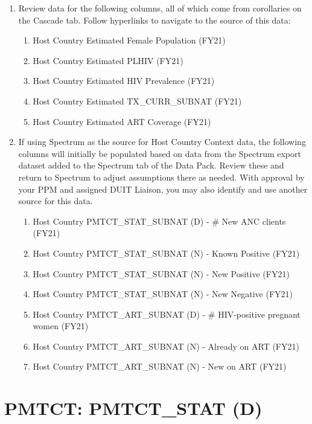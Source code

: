 \documentclass[
  openany]{book}
\begin{document}
\begin{enumerate}
\def\labelenumi{\arabic{enumi}.}
\item
  Review data for the following columns, all of which come from
  corollaries on the Cascade tab. Follow hyperlinks to navigate to the
  source of this data:

  \begin{enumerate}
  \def\labelenumii{\alph{enumii}.}
  \item
    Host Country Estimated Female Population (FY21)
  \item
    Host Country Estimated PLHIV (FY21)
  \item
    Host Country Estimated HIV Prevalence (FY21)
  \item
    Host Country Estimated TX\_CURR\_SUBNAT (FY21)
  \item
    Host Country Estimated ART Coverage (FY21)
  \end{enumerate}
\item
  If using Spectrum as the source for Host Country Context data, the
  following columns will initially be populated based on data from the
  Spectrum export dataset added to the Spectrum tab of the Data Pack.
  Review these and return to Spectrum to adjust assumptions there as
  needed. With approval by your PPM and assigned DUIT Liaison, you may
  also identify and use another source for this data.

  \begin{enumerate}
  \def\labelenumii{\alph{enumii}.}
  \item
    Host Country PMTCT\_STAT\_SUBNAT (D) - \# New ANC clients (FY21)
  \item
    Host Country PMTCT\_STAT\_SUBNAT (N) - Known Positive (FY21)
  \item
    Host Country PMTCT\_STAT\_SUBNAT (N) - New Positive (FY21)
  \item
    Host Country PMTCT\_STAT\_SUBNAT (N) - New Negative (FY21)
  \item
    Host Country PMTCT\_ART\_SUBNAT (D) - \# HIV-positive pregnant
    women (FY21)
  \item
    Host Country PMTCT\_ART\_SUBNAT (N) - Already on ART (FY21)
  \item
    Host Country PMTCT\_ART\_SUBNAT (N) - New on ART (FY21)
  \end{enumerate}
\end{enumerate}

\hypertarget{pmtct-pmtct_stat-d}{%
\section{PMTCT: PMTCT\_STAT (D)}\label{pmtct-pmtct_stat-d}}
\end{document}
